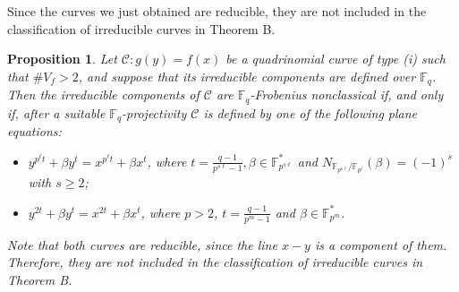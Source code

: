\documentclass[preprint,12pt]{elsarticle}
\newtheorem{proposition}[theorem]{Proposition}
\begin{document}
Since the curves we just obtained are reducible, they are not included in the classification of irreducible curves in Theorem B.

\begin{proposition}
    Let $\mathcal{C} \colon g(y) = f(x)$ be a quadrinomial curve of type (i) such that $\# V_f > 2$, and suppose that its irreducible components are defined over $\mathbb{F}_q$. Then the irreducible components of $\mathcal{C}$ are $\mathbb{F}_q$-Frobenius nonclassical if, and only if, after a suitable $\mathbb{F}_q$-projectivity $\mathcal{C}$ is defined by one of the following plane equations:
    \begin{itemize}
        \item[(i)] $y^{p^{\ell}t} + \beta y^{t} = x^{p^{\ell}t} + \beta x^t$, where $t = \frac{q - 1}{p^{s\ell} - 1}, \beta \in \mathbb{F}_{p^{s\ell}}^*$ and $N_{\mathbb{F}_{p^{s\ell}}/\mathbb{F}_{p^{\ell}}}(\beta) = (-1)^s$ with $s \geq 2$;
        
        \item[(ii)] $y^{2t} + \beta y^t = x^{2t} + \beta x^t$, where $p > 2$, $t = \frac{q - 1}{p^m - 1}$ and $\beta \in \mathbb{F}_{p^m}^*$.
    \end{itemize}
Note that both curves are reducible, since the line $x - y$ is a component of them. Therefore, they are not included in the classification of irreducible curves in Theorem B.
\end{proposition}
\end{document}
